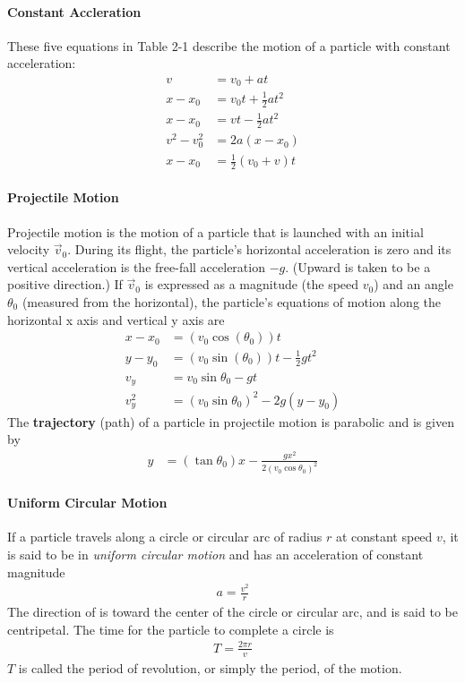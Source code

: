 \documentclass{article}
\numberwithin{equation}{subsection} %
\theoremstyle{definition}
\begin{document}
\paragraph{Constant Accleration}
These five equations in Table 2-1 describe the motion of a particle with constant acceleration:
\begin{align}
    v           &= v_0 + at \\
    x-x_0       &= v_0 t + \frac{1}{2} at^2\\
    x-x_0       &= vt - \frac{1}{2} at^2\\
    v^2 - v_0^2 &= 2a(x-x_0)\\
    x-x_0       &= \frac{1}{2} (v_0+v) t
\end{align}

\paragraph{Projectile Motion} Projectile motion is the motion of a
particle that is launched with an initial velocity $\vec v_0$. During
its flight, the particle’s horizontal acceleration is zero and its
vertical acceleration is the free-fall acceleration $-g$. (Upward is
taken to be a positive direction.) If $\vec v_0$ is expressed as a
magnitude (the speed $v_0$) and an angle $\theta_0$ (measured from the
horizontal), the particle’s equations of motion along the horizontal x
axis and vertical y axis are
\begin{align}
    x-x_0 &= (v_0 \cos(\theta_0) ) t \\
    y-y_0 &= (v_0 \sin(\theta_0) ) t - \frac{1}{2} gt^2 \\
    v_y   &= v_0 \sin{\theta_0} - gt \\
    v_y^2 &= (v_0 \sin{\theta_0})^2 - 2g (y-y_0)
\end{align}
The \textbf{trajectory} (path) of a particle in projectile motion is
parabolic and is given by
\begin{align}
    y &= (\tan{\theta_0}) x - \frac{gx^2}{2(v_0 \cos{\theta_0})^2} 
\end{align}

\paragraph{Uniform Circular Motion} If a particle travels along a circle
or circular arc of radius $r$ at constant speed $v$, it is said to be in
\textit{uniform circular motion} and has an acceleration of constant
magnitude
\begin{align}
    a = \frac{v^2}{r}
\end{align}
The direction of is toward the center of the circle or circular arc,
and is said to be centripetal. The time for the particle to complete
a circle is
\begin{align}
    T=\frac{2\pi r}{v}
\end{align}
$T$ is called the period of revolution, or simply the period, of the
motion.
\end{document}
